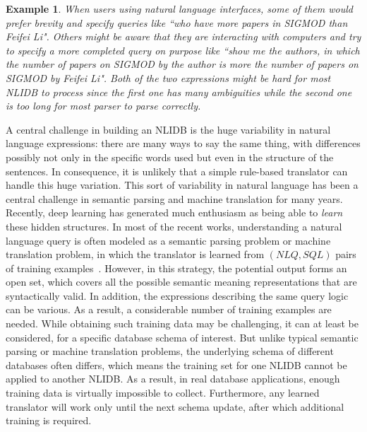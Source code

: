 \documentclass{vldb}
\newtheorem{example}{Example}
\begin{document}
\begin{example}
\label{example:feifeiliFirst}
When users using natural language interfaces, some of them would prefer brevity and specify queries like ``who have more papers in SIGMOD than Feifei Li".  Others might be aware that they are interacting with computers and try to specify a more completed query on purpose like ``show me the authors, in which the number of papers on SIGMOD by the author is more the number of papers on SIGMOD by Feifei Li".  Both of the two expressions might be hard for most NLIDB to process since the first one has many ambiguities while the second one is too long for most parser to parse correctly.  
\end{example}

A central challenge in building an NLIDB is the huge variability in natural language expressions: there are many ways to say the same thing, with differences possibly not only in the specific words used but even in the structure of the sentences.  In consequence, it is unlikely that a simple rule-based translator can handle this huge variation.  This sort of variability in natural language has been a central challenge in semantic parsing and machine translation for many years.  Recently, deep learning has generated much enthusiasm as being able to \emph{learn} these hidden structures.
In most of the recent works, understanding a natural language query is often modeled as a semantic parsing problem or machine translation problem, in which the translator is learned from $(NLQ, SQL)$ pairs of training examples~\cite{DBLP:conf/acl/DongL16,DBLP:journals/debu/LuLK16,DBLP:journals/cacm/Liang16,DBLP:journals/tacl/ReddyTCKDSL16}.    However, in this strategy, the potential output forms an open set, which covers all the possible semantic meaning representations that are syntactically valid.  In addition, the expressions describing the same query logic can be various.   As a result, a considerable number of training examples are needed.  While obtaining such training data may be challenging, it can at least be considered, for a specific database schema of interest.  But unlike typical semantic parsing or machine translation problems, the underlying schema of different databases often differs, which means the training set for one NLIDB cannot be applied to another NLIDB.  As a result, in real database applications, enough training data is virtually impossible to collect.  Furthermore, any learned translator will work only until the next schema update, after which additional training is required.
\end{document}
